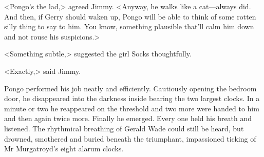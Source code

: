 <Pongo's the lad,> agreed Jimmy. <Anyway, he walks like a cat—always did. And then, if Gerry should waken up, Pongo will be able to think of some rotten silly thing to say to him. You know, something plausible that'll calm him down and not rouse his suspicions.>

<Something subtle,> suggested the girl Socks thoughtfully.

<Exactly,> said Jimmy.

Pongo performed his job neatly and efficiently. Cautiously opening the bedroom door, he disappeared into the darkness inside bearing the two largest clocks. In a minute or two he reappeared on the threshold and two more were handed to him and then again twice more. Finally he emerged. Every one held his breath and listened. The rhythmical breathing of Gerald Wade could still be heard, but drowned, smothered and buried beneath the triumphant, impassioned ticking of Mr Murgatroyd's eight alarum clocks.